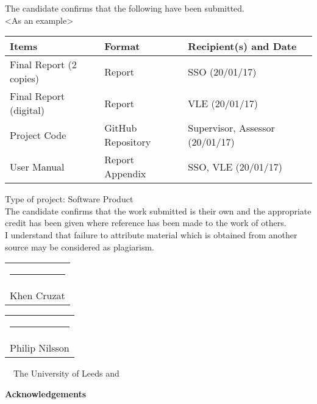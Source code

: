 \frontcover

\clearpage
\noindent The candidate confirms that the following have been submitted.\\
<As an example>
\begin{table}[ht!]
\begin{tabular}{|p{}|p{}|p{}|}
\hline 
Items & Format & Recipient(s) and Date \\ 
\hline 
Final Report (2 copies) & Report & SSO (20/01/17) \\ 
\hline 
Final Report (digital) & Report & VLE (20/01/17) \\ 
\hline 
Project Code & GitHub Repository & Supervisor, Assessor (20/01/17) \\ 
\hline 
User Manual & Report Appendix & SSO, VLE (20/01/17) \\ 
\hline 
\end{tabular} 
\end{table}

\noindent Type of project: Software Product
\vspace{\fill}\\
\noindent The candidate confirms that the work submitted is their own and the appropriate credit has been given where reference has been made to the work of others.
\vspace{\fill}\\
\noindent I understand that failure to attribute material which is obtained from another source may be considered as plagiarism.
\vspace{\fill}\\
\begin{tabular}[t]{@{}l} 
  \rule{50mm}{1pt}\\  Khen Cruzat
\end{tabular}
\hfill%
\begin{tabular}[t]{l@{}}
   \rule{50mm}{1pt}\\ Philip Nilsson
\end{tabular}
\flushleft 
\vspace{\fill}
\textcopyright~\session~The University of Leeds and~\fullname

\begin{dissertationsummary}

\end{dissertationsummary}

\clearpage
\centering\textbf{Acknowledgements}
\flushleft


\tableofcontents

